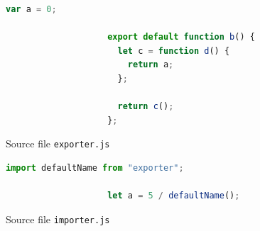 \begin{figure}[!htb]
	\begin{lstlisting}[language=JavaScript]
					var a = 0;

					export default function b() {
					  let c = function d() {
					    return a;
					  };

					  return c();
					};
	\end{lstlisting}
  \caption{Source file \lstinline{exporter.js}}
  \label{fig:running-example-exporter}
\end{figure}

\begin{figure}[!htb]
	\begin{lstlisting}[language=JavaScript]
					import defaultName from "exporter";

					let a = 5 / defaultName();
	\end{lstlisting}
  \caption{Source file \lstinline{importer.js}}
  \label{fig:running-example-importer}
\end{figure}


